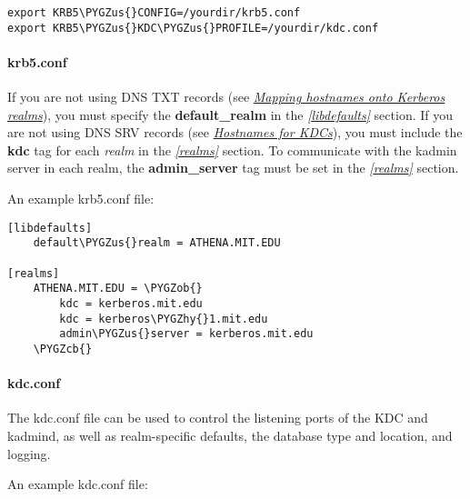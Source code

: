 \documentclass[letterpaper,10pt,english]{sphinxmanual}
\def\PYGZus{\char`\_}
\def\PYGZob{\char`\{}
\def\PYGZcb{\char`\}}
\def\PYGZhy{\char`\-}
\begin{document}
\begin{Verbatim}[commandchars=\\\{\}]
export KRB5\PYGZus{}CONFIG=/yourdir/krb5.conf
export KRB5\PYGZus{}KDC\PYGZus{}PROFILE=/yourdir/kdc.conf
\end{Verbatim}


\paragraph{krb5.conf}
\label{admin/install_kdc:krb5-conf}
If you are not using DNS TXT records (see {\hyperref[admin/realm_config:mapping-hostnames]{\emph{Mapping hostnames onto Kerberos realms}}}),
you must specify the \textbf{default\_realm} in the {\hyperref[admin/conf_files/krb5_conf:libdefaults]{\emph{{[}libdefaults{]}}}}
section.  If you are not using DNS SRV records (see
{\hyperref[admin/realm_config:kdc-hostnames]{\emph{Hostnames for KDCs}}}), you must include the \textbf{kdc} tag for each
\emph{realm} in the {\hyperref[admin/conf_files/krb5_conf:realms]{\emph{{[}realms{]}}}} section.  To communicate with the kadmin
server in each realm, the \textbf{admin\_server} tag must be set in the
{\hyperref[admin/conf_files/krb5_conf:realms]{\emph{{[}realms{]}}}} section.

An example krb5.conf file:

\begin{Verbatim}[commandchars=\\\{\}]
[libdefaults]
    default\PYGZus{}realm = ATHENA.MIT.EDU

[realms]
    ATHENA.MIT.EDU = \PYGZob{}
        kdc = kerberos.mit.edu
        kdc = kerberos\PYGZhy{}1.mit.edu
        admin\PYGZus{}server = kerberos.mit.edu
    \PYGZcb{}
\end{Verbatim}


\paragraph{kdc.conf}
\label{admin/install_kdc:kdc-conf}
The kdc.conf file can be used to control the listening ports of the
KDC and kadmind, as well as realm-specific defaults, the database type
and location, and logging.

An example kdc.conf file:
\end{document}
